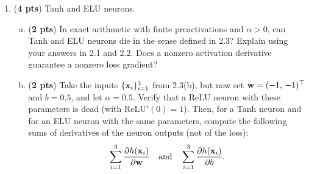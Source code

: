 \documentclass[11pt]{exam}
\begin{document}
\begin{enumerate}[1.]
\clearpage
\item (\textbf{4 pts}) Tanh and ELU neurons.
\begin{enumerate}[(a)]
    \item ({\bf 2 pts}) In exact arithmetic with finite preactivations and $\alpha > 0$, can Tanh and ELU neurons die in the sense defined in 2.3? Explain using your answers in 2.1 and 2.2. Does a nonzero activation derivative guarantee a nonzero loss gradient?
    \begin{tcolorbox}
\vspace{45ex}
\end{tcolorbox}
\newpage
    \item ({\bf 2 pts}) Take the inputs $\{{\bf x}_i\}_{i=1}^3$ from 2.3(b), but now set ${\bf w} = (-1,\, -1)^\top$ and $b = 0.5$, and let $\alpha = 0.5$. Verify that a ReLU neuron with these parameters is dead (with $\text{ReLU}'(0) = 1$). Then, for a Tanh neuron and for an ELU neuron with the same parameters, compute the following sums of derivatives of the neuron outputs (not of the loss):
    \[
    \sum_{i=1}^{3} \frac{\partial h({\bf x}_i)}{\partial {\bf w}} \quad \text{and} \quad \sum_{i=1}^{3} \frac{\partial h({\bf x}_i)}{\partial b}.
    \]
    \begin{tcolorbox}
\vspace{55ex}
\end{tcolorbox}
\end{enumerate}


\clearpage


\end{enumerate}
\end{document}
